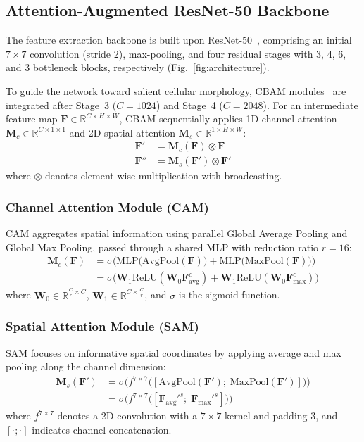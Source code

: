 \documentclass[conference]{IEEEtran}
\begin{document}
\subsection{Attention-Augmented ResNet-50 Backbone}
The feature extraction backbone is built upon ResNet-50~\cite{he2016deep}, comprising an initial $7 \times 7$ convolution (stride 2), max-pooling, and four residual stages with 3, 4, 6, and 3 bottleneck blocks, respectively (Fig.~\ref{fig:architecture}).

To guide the network toward salient cellular morphology, CBAM modules~\cite{woo2018cbam} are integrated after Stage~3 ($C=1024$) and Stage~4 ($C=2048$). For an intermediate feature map $\mathbf{F} \in \mathbb{R}^{C \times H \times W}$, CBAM sequentially applies 1D channel attention $\mathbf{M}_c \in \mathbb{R}^{C \times 1 \times 1}$ and 2D spatial attention $\mathbf{M}_s \in \mathbb{R}^{1 \times H \times W}$:
\begin{align}
\mathbf{F}' &= \mathbf{M}_c(\mathbf{F}) \otimes \mathbf{F} \label{eq:channel_apply} \\
\mathbf{F}'' &= \mathbf{M}_s(\mathbf{F}') \otimes \mathbf{F}' \label{eq:spatial_apply}
\end{align}
where $\otimes$ denotes element-wise multiplication with broadcasting.

\subsubsection{Channel Attention Module (CAM)}
CAM aggregates spatial information using parallel Global Average Pooling and Global Max Pooling, passed through a shared MLP with reduction ratio $r = 16$:
\begin{align}
\label{eq:channel_attention}
\mathbf{M}_c(\mathbf{F}) &= \sigma\Big(\text{MLP}\big(\text{AvgPool}(\mathbf{F})\big) + \text{MLP}\big(\text{MaxPool}(\mathbf{F})\big)\Big) \nonumber \\
&= \sigma\Big(\mathbf{W}_1 \text{ReLU}(\mathbf{W}_0 \mathbf{F}_{\text{avg}}^c) + \mathbf{W}_1 \text{ReLU}(\mathbf{W}_0 \mathbf{F}_{\text{max}}^c)\Big)
\end{align}
where $\mathbf{W}_0 \in \mathbb{R}^{\frac{C}{r} \times C}$, $\mathbf{W}_1 \in \mathbb{R}^{C \times \frac{C}{r}}$, and $\sigma$ is the sigmoid function.

\subsubsection{Spatial Attention Module (SAM)}
SAM focuses on informative spatial coordinates by applying average and max pooling along the channel dimension:
\begin{align}
\label{eq:spatial_attention}
\mathbf{M}_s(\mathbf{F}') &= \sigma\Big(f^{7 \times 7}\big([\text{AvgPool}(\mathbf{F}');\; \text{MaxPool}(\mathbf{F}')]\big)\Big) \nonumber \\
&= \sigma\Big(f^{7 \times 7}\big([\mathbf{F}_{\text{avg}}'^s;\; \mathbf{F}_{\text{max}}'^s]\big)\Big)
\end{align}
where $f^{7 \times 7}$ denotes a 2D convolution with a $7 \times 7$ kernel and padding 3, and $[\cdot;\cdot]$ indicates channel concatenation.
\end{document}
